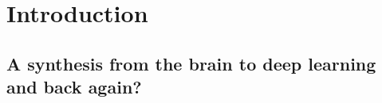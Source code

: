 \documentclass[mphil,deptreport,ai]{infthesis} %
\begin{document}
\chapter{Introduction}






\section{A synthesis from the brain to deep learning and back again?}
\end{document}
